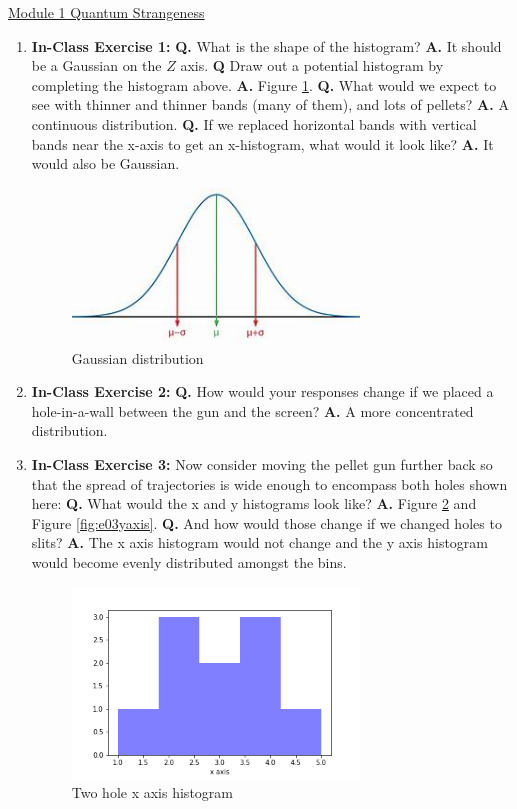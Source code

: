 \documentclass[main.tex]{subfiles}
\begin{document}
\href{https://www2.seas.gwu.edu/~simhaweb/quantum/modules/module1/module1.html}{Module 1 Quantum Strangeness}

\begin{enumerate}

\item[] \textbf{In-Class Exercise 1:} \textbf{Q.} What is the shape of the histogram? \textbf{A.} It should be a Gaussian on the $Z$ axis. \textbf{Q} Draw out a potential histogram by completing the histogram above. \textbf{A.} Figure \ref{fig:e01Gaussian}. \textbf{Q.} What would we expect to see with thinner and thinner bands (many of them), and lots of pellets? \textbf{A.} A continuous distribution. \textbf{Q.} If we replaced horizontal bands with vertical bands near the x-axis to get an x-histogram, what would it look like? \textbf{A.} It would also be Gaussian.

\begin{figure}
  \centering
  \includegraphics[width=3in]{modules/figs/m01/e01gaussian.jpeg}
  \caption{Gaussian distribution}
  \label{fig:e01Gaussian}
\end{figure}

\item[] \textbf{In-Class Exercise 2:} \textbf{Q.} How would your responses change if we placed a hole-in-a-wall between the gun and the screen? \textbf{A.} A more concentrated distribution.

\item[] \textbf{In-Class Exercise 3:}  Now consider moving the pellet gun further back so that the spread of trajectories is wide enough to encompass both holes shown here: \textbf{Q.} What would the x and y histograms look like? \textbf{A.} Figure \ref{fig:e03xaxis} and Figure \ref{fig:e03yaxis}. \textbf{Q.} And how would those change if we changed holes to slits? \textbf{A.} The x axis histogram would not change and the y axis histogram would become evenly distributed amongst the bins.

\begin{figure}
  \centering
  \includegraphics[width=3in]{modules/figs/m01/e03xaxis.png}
  \caption{Two hole x axis histogram}
  \label{fig:e03xaxis}
\end{figure}


\end{enumerate}
\end{document}
